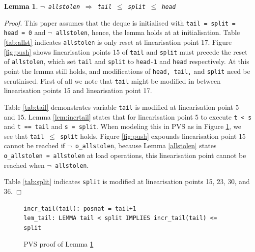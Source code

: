 \documentclass{sig-alternate-br}
\newtheorem{lemma}{Lemma}
\begin{document}
\begin{lemma}
	\texttt{$\neg$ allstolen $\Rightarrow$ tail $\leq$ split $\leq$ head}
	\label{lem:allst.var}
\end{lemma}
\begin{proof}
	This paper assumes that the deque is initialised with \texttt{tail = split = head = 0} and \texttt{$\neg$ allstolen}, hence, the lemma holds at at initialisation.
	Table \ref{tab:allst} indicates \texttt{allstolen} is only reset at linearisation point 17.
	Figure \ref{fig:push} shows linearisation points 15 of \texttt{tail} and \texttt{split} must precede the reset of \texttt{allstolen}, which set \texttt{tail} and \texttt{split} to \texttt{head-1} and \texttt{head} respectively.
	At this point the lemma still holds, and modifications of \texttt{head, tail,} and \texttt{split} need be scrutinised.
	First of all we note that \texttt{tail} might be modified in between linearisation points 15 and linearisation point 17.
	
	Table \ref{tab:tail} demonstrates variable \texttt{tail} is modified at linearisation point 5 and 15.
	Lemma \ref{lem:incrtail} states that for linearisation point 5 to execute \texttt{t < s} and \texttt{t == tail} and \texttt{s = split}.
	When modeling this in PVS as in Figure \ref{pvs:allst.var}, we see that \texttt{tail $\leq$ split} holds.
	Figure \ref{fig:push} expounds linearisation point 15 cannot be reached if \texttt{$\neg$ o_allstolen}, because Lemma \ref{allstolen} states \texttt{o\_allstolen = allstolen} at load operations, this linearisation point cannot be reached when \texttt{$\neg$ allstolen}.
	
	Table \ref{tab:split} indicates \texttt{split} is modified at linearisation points 15, 23, 30, and 36.
\end{proof}
\begin{figure}[h]
	\texttt{incr\_tail(tail): posnat = tail+1}\\
	\texttt{lem\_tail: LEMMA tail < split IMPLIES incr\_tail(tail) <= split}
	\caption{PVS proof of Lemma \ref{lem:allst.var}}
	\label{pvs:allst.var}
\end{figure}
\end{document}
